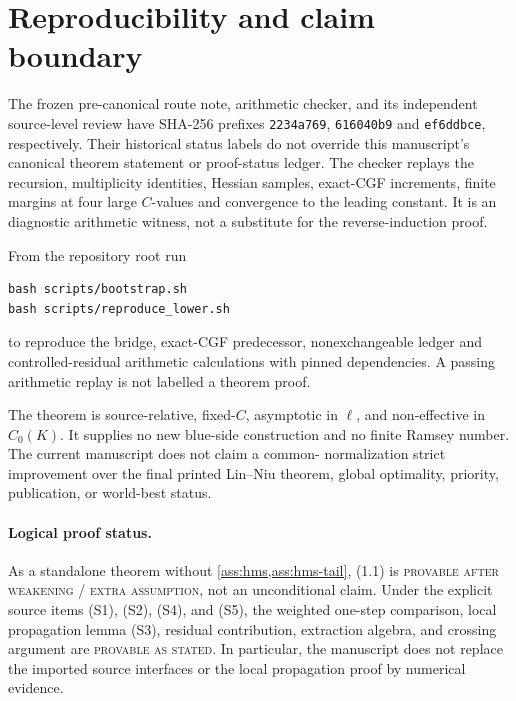 \section{Reproducibility and claim boundary}\label{sec:scope-lower}

The frozen pre-canonical route note, arithmetic checker, and its independent
source-level review have SHA-256 prefixes \texttt{2234a769},
\texttt{616040b9} and \texttt{ef6ddbce}, respectively.  Their historical
status labels do not override this manuscript's canonical theorem statement
or proof-status ledger.  The checker replays the recursion,
multiplicity identities, Hessian samples, exact-CGF increments, finite margins
at four large \(C\)-values and convergence to the leading constant.  It is an
diagnostic arithmetic witness, not a substitute for the reverse-induction
proof.

From the repository root run
\begin{verbatim}
bash scripts/bootstrap.sh
bash scripts/reproduce_lower.sh
\end{verbatim}
to reproduce the bridge, exact-CGF predecessor, nonexchangeable ledger and
controlled-residual arithmetic calculations with pinned dependencies.  A
passing arithmetic replay is not labelled a theorem proof.

The theorem is source-relative, fixed-\(C\), asymptotic in \(\ell\), and
non-effective in \(C_0(K)\).  It supplies no new blue-side construction and no
finite Ramsey number.  The current manuscript does not claim a common-
normalization strict improvement over the final printed Lin--Niu theorem,
global optimality, priority, publication, or world-best status.

\paragraph{Logical proof status.}
As a standalone theorem without \cref{ass:hms,ass:hms-tail}, (1.1) is
\textsc{provable after weakening / extra assumption}, not an unconditional
claim.  Under the explicit source items (S1), (S2), (S4), and (S5), the
weighted one-step comparison, local propagation lemma (S3), residual
contribution, extraction algebra, and crossing argument are
\textsc{provable as stated}.  In particular, the manuscript does not replace
the imported source interfaces or the local propagation proof by numerical
evidence.
